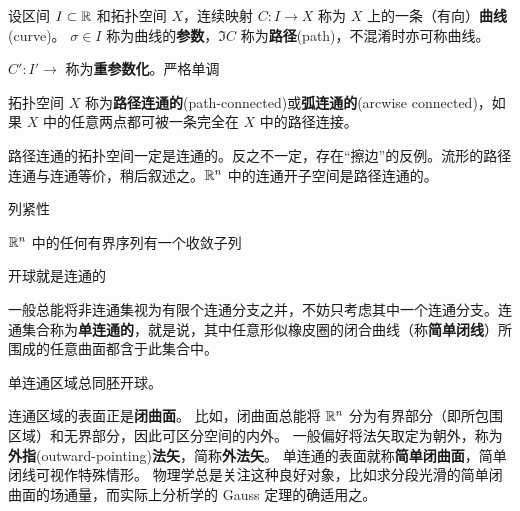 \begin{definition}
    设区间 $I\subset\mathbb{R}$ 和拓扑空间 $X$，连续映射 $C:I\to X$ 称为 $X$ 上的一条（有向）\textbf{曲线}(curve)。
    $\sigma\in I$ 称为曲线的\textbf{参数}，$\Im C$ 称为\textbf{路径}(path)，不混淆时亦可称曲线。
\end{definition}

\begin{definition}
    $C':I'\to $ 称为\textbf{重参数化}。严格单调
\end{definition}

\begin{definition}
    拓扑空间 $X$ 称为\textbf{路径连通的}(path-connected)或\textbf{弧连通的}(arcwise connected)，如果 $X$ 中的任意两点都可被一条完全在 $X$ 中的路径连接。
\end{definition}

路径连通的拓扑空间一定是连通的。反之不一定，存在“擦边”的反例。流形的路径连通与连通等价，稍后叙述之。$\mathbb{R}^{n}$ 中的连通开子空间是路径连通的。

列紧性

$\mathbb{R}^{n}$ 中的任何有界序列有一个收敛子列

开球就是连通的

一般总能将非连通集视为有限个连通分支之并，不妨只考虑其中一个连通分支。连通集合称为\textbf{单连通的}，就是说，其中任意形似橡皮圈的闭合曲线（称\textbf{简单闭线}）所围成的任意曲面都含于此集合中。

单连通区域总同胚开球。

连通区域的表面正是\textbf{闭曲面}。
比如，闭曲面总能将 $\mathbb{R}^n$ 分为有界部分（即所包围区域）和无界部分，因此可区分空间的内外。
一般偏好将法矢取定为朝外，称为\textbf{外指}(outward-pointing)\textbf{法矢}，简称\textbf{外法矢}。
单连通的表面就称\textbf{简单闭曲面}，简单闭线可视作特殊情形。
物理学总是关注这种良好对象，比如求分段光滑的简单闭曲面的场通量，而实际上分析学的 Gauss 定理的确适用之。
